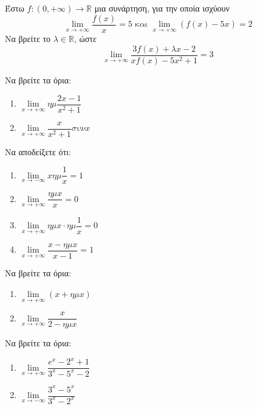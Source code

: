 \documentclass{presentation}
\begin{document}
\begin{askisi}
  Έστω $f:(0,+\infty)\to\mathbb{R}$ μια συνάρτηση, για την οποία ισχύουν
  $$\lim\limits_{x \to +\infty}{ \dfrac{f(x)}{x} }=5 \text{ και } \lim\limits_{x \to +\infty}{ (f(x)-5x) }=2$$
  Να βρείτε το $λ\in\mathbb{R}$, ώστε
  $$\lim\limits_{x \to +\infty}{ \dfrac{3f(x)+λx-2}{xf(x)-5x^2+1} }=3$$
\end{askisi}

\begin{askisi}
  Να βρείτε τα όρια:
  \begin{enumerate}
    \item $\lim\limits_{x \to +\infty}{ ημ\dfrac{2x-1}{x^2+1} }$ \pause
    \item $\lim\limits_{x \to +\infty}{ \dfrac{x}{x^2+1}συνx  }$
  \end{enumerate}
\end{askisi}

\begin{askisi}
  Να αποδείξετε ότι:
  \begin{enumerate}
    \item $\lim\limits_{x \to -\infty}{ xημ\dfrac{1}{x} }=1$ \pause
    \item $\lim\limits_{x \to +\infty}{ \dfrac{ημx}{x}  }=0$  \pause
    \item $\lim\limits_{x \to +\infty}{ ημx\cdot ημ\dfrac{1}{x}  }=0$  \pause
    \item $\lim\limits_{x \to +\infty}{ \dfrac{x-ημx}{x-1}  }=1$
  \end{enumerate}
\end{askisi}

\begin{askisi}
  Να βρείτε τα όρια:
  \begin{enumerate}
    \item $\lim\limits_{x \to +\infty}{ (x+ημx) }$ \pause
    \item $\lim\limits_{x \to +\infty}{ \dfrac{x}{2-ημx}  }$
  \end{enumerate}
\end{askisi}

\begin{askisi}
  Να βρείτε τα όρια:
  \begin{enumerate}
    \item $\lim\limits_{x \to +\infty}{ \dfrac{e^x-2^x+1}{3^x-5^x-2} }$ \pause
    \item $\lim\limits_{x \to -\infty}{ \dfrac{3^x-5^x}{3^x-2^x}  }$
  \end{enumerate}
\end{askisi}
\end{document}
